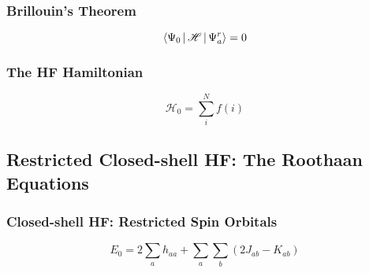 \documentclass[a4paper]{article}
\numberwithin{equation}{section}
\begin{document}
\subsubsection{Brillouin's Theorem}
\begin{equation}\label{key}
\Braket{\Psi_0 | \mathscr{H} | \Psi_a^r} = 0
\end{equation}

\subsubsection{The HF Hamiltonian}
\begin{equation}\label{key}
\mathscr{H}_0 = \sum_i^N f(i) 
\end{equation}

\subsection{Restricted Closed-shell HF: The Roothaan Equations}
\subsubsection{Closed-shell HF: Restricted Spin Orbitals}
\begin{equation}\label{key}
E_0 = 2\sum_a h_{aa} + \sum_a\sum_b(2J_{ab} - K_{ab})
\end{equation}
\end{document}
